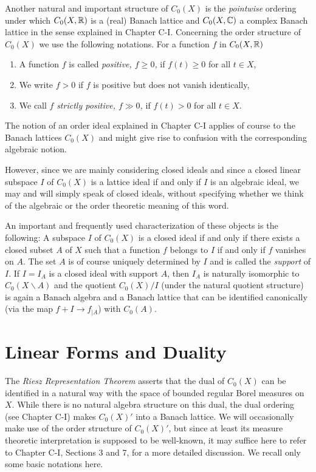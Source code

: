 Another natural and important structure of $C_{0}(X)$ is the \emph{pointwise} ordering under which $C_{0}(X,\mathbb{R})$ is a (real) Banach lattice and $C_{0}(X,\mathbb{C})$ a complex Banach lattice in the sense explained in Chapter C-I.
Concerning the order structure of $C_{0}(X)$ we use the following notations.
For a function $f$ in $C_{0}(X,\mathbb{R})$
\begin{enumerate}[\upshape (i), labelindent=.5em]
\item
A function $ f $ is called \emph{positive, $ f \geq 0 $,} if $ f(t) \geq 0  $ for all $ t \in X $, 

\item
We write $  f > 0 $ if $ f $ is positive but does not vanish identically,

\item
We call $ f $ \emph{strictly positive, $f \gg 0$,}  if $ f(t) > 0 $ for all $ t \in X $.

\end{enumerate}
The notion of an order ideal explained in Chapter C-I applies of course to the Banach lattices $C_{0}(X)$ and might give rise to confusion with the corresponding algebraic notion.

However, since we are mainly considering closed ideals and since a closed linear subspace $I$ of $C_{0}(X)$ is a lattice ideal if and only if $I$ is an algebraic ideal, we may and will simply speak of closed ideals, without specifying whether we think of the algebraic or the order theoretic meaning of this word.

An important and frequently used characterization of these objects is the following: A subspace $I$ of $C_{0}(X)$ is a closed ideal if and only if there exists a closed subset $A$ of $X$ such that a function $f$ belongs to $I$ if and only if $f$ vanishes on $A$.
The set $A$ is of course uniquely determined by $I$ and is called the \emph{support} of $I$.
If $I = I_{A}$ is a closed ideal with support $A$, then $I_{A}$ is naturally isomorphic to $C_{0}(X\backslash A)$ and the quotient $C_{0}(X)/I$ (under the natural quotient structure) is again a Banach algebra and a Banach lattice that can be identified canonically (via the map $f + I \to f_{|A}$) with $C_{0}(A)$.
\section{Linear Forms and Duality}\label{sec:b1-2}%
The \emph{Riesz Representation Theorem} asserts that the dual of $C_{0}(X)$ can be identified in a natural way with the space of bounded regular Borel measures on $X$.
While there is no natural algebra structure on this dual, the dual ordering (see Chapter C-I) makes $C_{0}(X)'$ into a Banach lattice.
We will occasionally make use of the order structure of $C_{0}(X)'$, but since at least its measure theoretic interpretation is supposed to be well-known, it may suffice here to refer to Chapter C-I, Sections 3 and 7, for a more detailed discussion.
We recall only some basic notations here.

